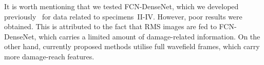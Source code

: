 \begin{sloppypar}
	
	It is worth mentioning that we tested FCN-DenseNet, which we developed previously~\cite{Ijjeh2021} for data related to specimens~II-IV. 
	However, poor results were obtained. 
	This is attributed to the fact that RMS images are fed to FCN-DenseNet, which carries a limited amount of damage-related information. 
	On the other hand, currently proposed methods utilise full wavefield frames, which carry more damage-reach features. 
		

\end{sloppypar}
